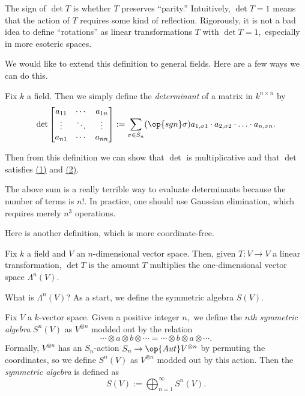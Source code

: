 \begin{remark}
	The sign of $\det T$ is whether $T$ preserves ``parity.'' Intuitively, $\det T=1$ means that the action of $T$ requires some kind of reflection. Rigorously, it is not a bad idea to define ``rotations'' as linear transformations $T$ with $\det T=1,$ especially in more esoteric spaces.
\end{remark}
We would like to extend this definition to general fields. Here are a few ways we can do this.
\begin{definition}[Determinants, I]
	Fix $k$ a field. Then we simply define the \textit{determinant} of a matrix in $k^{n\times n}$ by
	\[\det\begin{bmatrix}
		a_{11} & \cdots & a_{1n} \\
		\vdots & \ddots & \vdots \\
		a_{n1} & \cdots & a_{nn}
	\end{bmatrix}:=\sum_{\sigma\in S_n}(\op{sgn}\sigma)a_{1,\sigma1}\cdot a_{2,\sigma2}\cdot\ldots\cdot a_{n,\sigma n}.\]
\end{definition}
Then from this definition we can show that $\det$ is multiplicative and that $\det$ satisfies \hyperref[eq:det1]{(1)} and \hyperref[eq:det2]{(2)}.
\begin{warn}
	The above sum is a really terrible way to evaluate determinants because the number of terms is $n!.$ In practice, one should use Gaussian elimination, which requires merely $n^3$ operations.
\end{warn}
Here is another definition, which is more coordinate-free.
\begin{definition}[Determinants, II]
	Fix $k$ a field and $V$ an $n$-dimensional vector space. Then, given $T:V\to V$ a linear transformation, $\det T$ is the amount $T$ multiplies the one-dimensional vector space $\Lambda^n(V).$
\end{definition}
What is $\Lambda^n(V)$? As a start, we define the symmetric algebra $S(V).$
\begin{definition}
	Fix $V$ a $k$-vector space. Given a positive integer $n,$ we define the \textit{$n$th symmetric algebra} $S^n(V)$ as $V^{\otimes n}$ modded out by the relation
	\[\cdots\otimes a\otimes b\otimes\cdots=\cdots\otimes b\otimes a\otimes\cdots.\]
	Formally, $V^{\otimes n}$ has an $S_n$-action $S_n\to\op{Aut}V^{\otimes n}$ by permuting the coordinates, so we define $S^n(V)$ as $V^{\otimes n}$ modded out by this action. Then the \textit{symmetric algebra} is defined as
	\[S(V):=\bigoplus_{n=1}^\infty S^n(V).\]
\end{definition}
